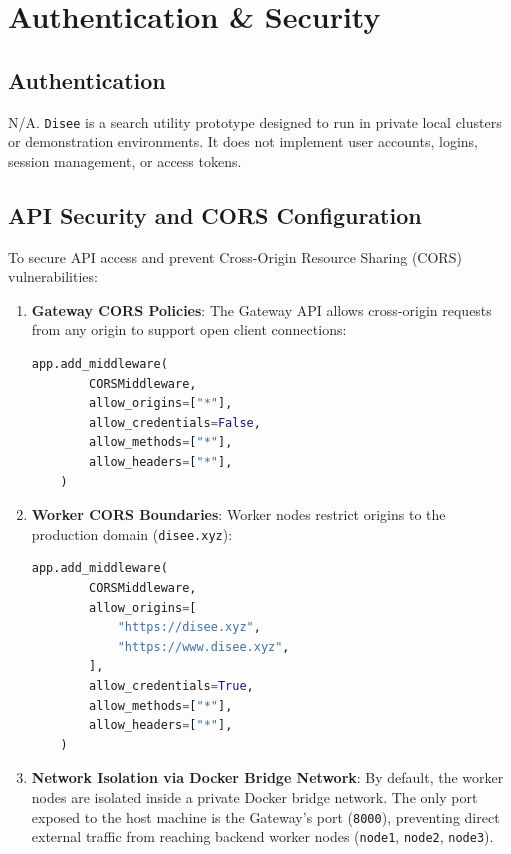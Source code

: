 \documentclass[11pt,a4paper]{article}
\begin{document}
\newpage

\section{Authentication & Security}

\subsection{Authentication}
N/A. \texttt{Disee} is a search utility prototype designed to run in private local clusters or demonstration environments. It does not implement user accounts, logins, session management, or access tokens.

\subsection{API Security and CORS Configuration}
To secure API access and prevent Cross-Origin Resource Sharing (CORS) vulnerabilities:
\begin{enumerate}
    \item \textbf{Gateway CORS Policies}:
    The Gateway API allows cross-origin requests from any origin to support open client connections:
    \begin{lstlisting}[language=Python]
    app.add_middleware(
        CORSMiddleware,
        allow_origins=["*"],
        allow_credentials=False,
        allow_methods=["*"],
        allow_headers=["*"],
    )
    \end{lstlisting}

    \item \textbf{Worker CORS Boundaries}:
    Worker nodes restrict origins to the production domain (\texttt{disee.xyz}):
    \begin{lstlisting}[language=Python]
    app.add_middleware(
        CORSMiddleware,
        allow_origins=[
            "https://disee.xyz",
            "https://www.disee.xyz",
        ],
        allow_credentials=True,
        allow_methods=["*"],
        allow_headers=["*"],
    )
    \end{lstlisting}

    \item \textbf{Network Isolation via Docker Bridge Network}:
    By default, the worker nodes are isolated inside a private Docker bridge network. The only port exposed to the host machine is the Gateway's port (\texttt{8000}), preventing direct external traffic from reaching backend worker nodes (\texttt{node1}, \texttt{node2}, \texttt{node3}).
\end{enumerate}
\end{document}
